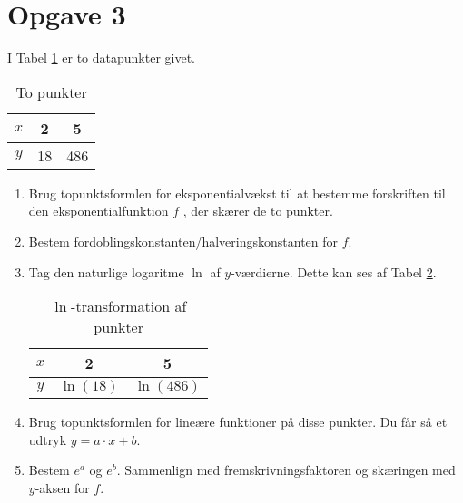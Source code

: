\section*{Opgave 3}
I Tabel \ref{tab:tab1} er to datapunkter givet.
\begin{table}[H]
\centering
\begin{tabular}{c|c|c}
$x$ & 2 & 5\\ \hline
$y$ & 18 & 486
\end{tabular}
\caption{To punkter}
\label{tab:tab1}
\end{table}
\begin{enumerate}[label=\roman*)]
\item Brug topunktsformlen for eksponentialvækst til at bestemme forskriften til den eksponentialfunktion $f$ , der skærer de to punkter. 
\item Bestem fordoblingskonstanten/halveringskonstanten for $f$.
\item Tag den naturlige logaritme $\ln$ af $y$-værdierne. Dette kan ses af Tabel \ref{tab:tab2}.
\begin{table}[H]
\centering
\begin{tabular}{c|c|c}
$x$ & 2 & 5\\ \hline
$y$ & $\ln(18)$ & $\ln(486)$
\end{tabular}
\caption{$\ln$-transformation af punkter}
\label{tab:tab2}
\end{table}
\item Brug topunktsformlen for lineære funktioner på disse punkter. Du får så et udtryk $y = a\cdot x + b$. 
\item Bestem $e^{a}$ og $e^b$. Sammenlign med fremskrivningsfaktoren og skæringen med $y$-aksen for $f$. 
\end{enumerate}


